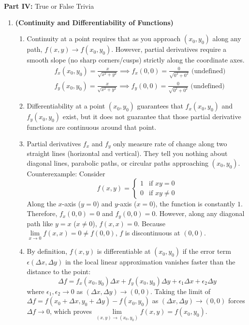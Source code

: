 \documentclass{article}
\begin{document}
\newpage

\noindent \textbf{Part IV: } True or False Trivia
\begin{enumerate}[label={\bfseries Theorem}, wide = 0pt]
\vspace{-0.5em}
\item \textbf{(Continuity and Differentiability of Functions)}
\begin{enumerate}
    \item Continuity at a point requires that as you approach $(x_0,y_0)$ along any path, $f(x,y) \to f(x_0,y_0)$. However, partial derivatives require a smooth slope (no sharp corners/cusps) strictly along the coordinate axes.
\begin{align*}
    &f_x(x_0,y_0) = \frac{x}{\sqrt{x^2+y^2}} \implies f_x(0,0) = \frac{0}{\sqrt{0^2+0^2}} \text{ (undefined)} \\
    &f_y(x_0,y_0) = \frac{x}{\sqrt{x^2+y^2}} \implies f_y(0,0) = \frac{0}{\sqrt{0^2+0^2}} \text{ (undefined)}
\end{align*}
    \item Differentiability at a point $(x_0,y_0)$ guarantees that $f_x(x_0,y_0)$ and $f_y(x_0,y_0)$ exist, but it does not guarantee that those partial derivative functions are continuous around that point.
    \item Partial derivatives $f_x$ and $f_y$ only measure rate of change along two straight lines (horizontal and vertical). They tell you nothing about diagonal lines, parabolic paths, or circular paths approaching $(x_0,y_0)$. Counterexample: Consider $$f(x,y) = \begin{cases} 1 & \text{if } xy = 0 \\ 0 & \text{if } xy \neq 0 \end{cases}$$Along the $x$-axis ($y=0$) and $y$-axis ($x=0$), the function is constantly $1$. Therefore, $f_x(0,0) = 0$ and $f_y(0,0) = 0$. However, along any diagonal path like $y = x$ ($x \neq 0$), $f(x,x) = 0$. Because $\lim\limits_{x \to 0} f(x,x) = 0 \neq f(0,0)$, $f$ is discontinuous at $(0,0)$.
    \item By definition, $f(x,y)$ is differentiable at $(x_0,y_0)$ if the error term $\epsilon(\Delta x, \Delta y)$ in the local linear approximation vanishes faster than the distance to the point:$$\Delta f = f_x(x_0,y_0)\Delta x + f_y(x_0,y_0)\Delta y + \epsilon_1 \Delta x + \epsilon_2 \Delta y$$where $\epsilon_1, \epsilon_2 \to 0$ as $(\Delta x, \Delta y) \to (0,0)$. Taking the limit of $\Delta f = f(x_0+\Delta x, y_0+\Delta y) - f(x_0,y_0)$ as $(\Delta x, \Delta y) \to (0,0)$ forces $\Delta f \to 0$, which proves $\lim\limits_{(x,y) \to (x_0,y_0)} f(x,y) = f(x_0,y_0)$.

\end{enumerate}
\end{enumerate}
\end{document}
